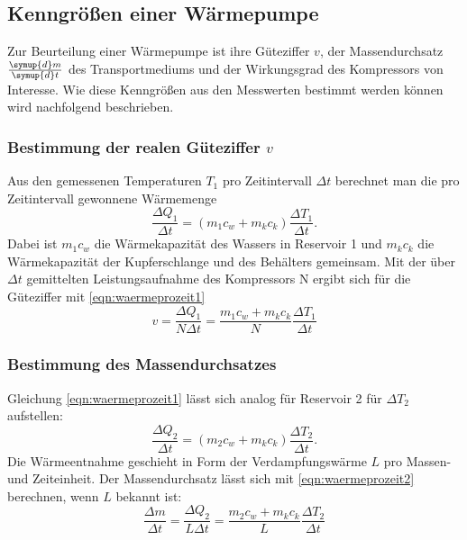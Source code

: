   \subsection{Kenngrößen einer Wärmepumpe}
  Zur Beurteilung einer Wärmepumpe ist ihre Güteziffer $v$, der Massendurchsatz
  $\frac{\symup{d}m}{\symup{d}t}$ des Transportmediums und der Wirkungsgrad des
  Kompressors von Interesse. Wie diese Kenngrößen aus den Messwerten bestimmt werden
  können wird nachfolgend beschrieben.
  \subsubsection{Bestimmung der realen Güteziffer $v$}
  Aus den gemessenen Temperaturen $T_1$ pro Zeitintervall $\Delta t$ berechnet man
  die pro Zeitintervall gewonnene Wärmemenge
  \begin{equation}
    \frac{\Delta Q_1}{\Delta t} = (m_1 c_w + m_k c_k) \frac{\Delta T_1}{\Delta t}.
    \label{eqn:waermeprozeit1}
  \end{equation}
  Dabei ist $m_1 c_w$ die Wärmekapazität des Wassers in Reservoir 1 und $m_k c_k$
  die Wärmekapazität der Kupferschlange und des Behälters gemeinsam.
  Mit der über $\Delta t$ gemittelten Leistungsaufnahme des Kompressors N ergibt
  sich für die Güteziffer mit \eqref{eqn:waermeprozeit1}
  \begin{equation}
    v = \frac{\Delta Q_1}{N\Delta t} = \frac{m_1 c_w + m_k c_k}{N} \frac{\Delta T_1}{\Delta t}
    \label{eqn:berechnung_gueteziffer}
  \end{equation}


  \subsubsection{Bestimmung des Massendurchsatzes}
  Gleichung \eqref{eqn:waermeprozeit1} lässt sich analog für Reservoir 2 für
  $\Delta T_2$ aufstellen:
  \begin{equation}
    \frac{\Delta Q_2}{\Delta t} = (m_2 c_w + m_k c_k) \frac{\Delta T_2}{\Delta t}.
    \label{eqn:waermeprozeit2}
  \end{equation}
  Die Wärmeentnahme geschieht in Form der Verdampfungswärme $L$ pro Massen- und
  Zeiteinheit. Der Massendurchsatz lässt sich mit \eqref{eqn:waermeprozeit2} berechnen,
  wenn $L$ bekannt ist:
  \begin{equation}
    \frac{\Delta m}{\Delta t} = \frac{\Delta Q_2}{L\Delta t}
    = \frac{m_2 c_w + m_k c_k}{L} \frac{\Delta T_2}{\Delta t}
    \label{eqn:massendurchsatz}
  \end{equation}



